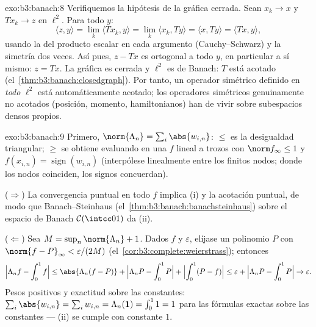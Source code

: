 \begin{solution}{exo:b3:banach:8}
Verifiquemos la hipótesis de la gráfica cerrada. Sean $x_k \to x$ y
$Tx_k \to z$ en $\ell^2$. Para todo $y$:
\[
\langle z, y\rangle = \lim_k\langle Tx_k, y\rangle
= \lim_k \langle x_k, Ty\rangle = \langle x, Ty\rangle
= \langle Tx, y\rangle,
\]
usando la  del producto
escalar en cada argumento (Cauchy--Schwarz) y la simetría dos veces. Así
pues, $z - Tx$ es ortogonal a todo $y$, en particular a sí mismo:
$z = Tx$. La gráfica es cerrada y $\ell^2$ es de Banach: $T$ está
acotado (el~\cref{thm:b3:banach:closedgraph}). Por tanto, un operador
simétrico definido en \emph{todo} $\ell^2$ está automáticamente acotado;
los operadores simétricos genuinamente no acotados (posición, momento,
hamiltonianos) han de vivir sobre subespacios densos propios.
\end{solution}

\begin{solution}{exo:b3:banach:9}
Primero, $\norm{\Lambda_n} = \sum_i\abs{w_{i,n}}$: $\leq$ es la
desigualdad triangular; $\geq$ se obtiene evaluando en una $f$ lineal a
trozos con $\norm f_\infty \leq 1$ y $f(x_{i,n}) =
\operatorname{sign}(w_{i,n})$ (interpólese linealmente entre los finitos
nodos; donde los nodos coinciden, los signos concuerdan).

($\Rightarrow$) La convergencia puntual en todo $f$ implica (i) y la
acotación puntual, de modo que Banach--Steinhaus
(el~\cref{thm:b3:banach:banachsteinhaus}) sobre el espacio de Banach
$\mathcal
C(\intcc01)$ da (ii).

($\Leftarrow$) Sea $M = \sup_n\norm{\Lambda_n} + 1$. Dados $f$ y
$\varepsilon$, elíjase un polinomio $P$ con $\norm{f -
P}_\infty < \varepsilon/(2M)$ (el~\cref{cor:b3:complete:weierstrass});
entonces
\[
\Bigl|\Lambda_n f - \int_0^1 f\Bigr|
\leq \abs{\Lambda_n(f - P)} + \Bigl|\Lambda_nP -
\int_0^1P\Bigr| + \Bigl|\int_0^1(P - f)\Bigr|
\leq \varepsilon + \Bigl|\Lambda_nP - \int_0^1P\Bigr| \to
\varepsilon .
\]
Pesos positivos y exactitud sobre las constantes: $\sum_i\abs{w_{i,n}}
= \sum_iw_{i,n} = \Lambda_n(\mathbf 1) = \int_0^1 1 = 1$ para las
fórmulas exactas sobre las constantes --- (ii) se cumple con constante
$1$.
\end{solution}

